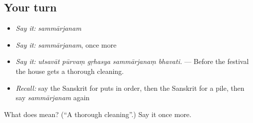 \subsection*{Your turn}
\begin{itemize}
\raggedright
  \item \emph{Say it:} \emph{sammārjanam}
  \item \emph{Say it:} \emph{sammārjanam}, once more
  \item \emph{Say it:} \emph{utsavāt pūrvaṃ gṛhasya sammārjanaṃ bhavati.} — Before the festival the house gets a thorough cleaning.
  \item \emph{Recall:} say the Sanskrit for puts in order, then the Sanskrit for a pile, then say \emph{sammārjanam} again
\end{itemize}

\begin{tcolorbox}[breakable,colback=teal!4,colframe=teal!35!black,title={Before you move on}]
What does  mean? (\textquotedblleft{}A thorough cleaning\textquotedblright{}.) Say it once more.
\end{tcolorbox}

